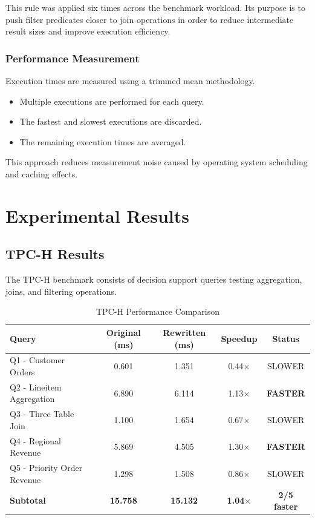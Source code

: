 \documentclass[12pt,a4paper]{article}
\begin{document}
This rule was applied six times across the benchmark workload. Its purpose is to push filter predicates closer to join operations in order to reduce intermediate result sizes and improve execution efficiency.

\subsubsection{Performance Measurement}

Execution times are measured using a trimmed mean methodology.

\begin{itemize}
    \item Multiple executions are performed for each query.
    \item The fastest and slowest executions are discarded.
    \item The remaining execution times are averaged.
\end{itemize}

This approach reduces measurement noise caused by operating system scheduling and caching effects.

\section{Experimental Results}

\subsection{TPC-H Results}

The TPC-H benchmark consists of decision support queries testing aggregation, joins, and filtering operations.

\begin{table}[H]
\centering
\caption{TPC-H Performance Comparison}
\begin{tabular}{|l|c|c|c|c|}
\hline
\textbf{Query} & \textbf{Original (ms)} & \textbf{Rewritten (ms)} & \textbf{Speedup} & \textbf{Status} \\
\hline
Q1 - Customer Orders & 0.601 & 1.351 & 0.44$\times$ & SLOWER \\
Q2 - Lineitem Aggregation & 6.890 & 6.114 & 1.13$\times$ & \textbf{FASTER} \\
Q3 - Three Table Join & 1.100 & 1.654 & 0.67$\times$ & SLOWER \\
Q4 - Regional Revenue & 5.869 & 4.505 & 1.30$\times$ & \textbf{FASTER} \\
Q5 - Priority Order Revenue & 1.298 & 1.508 & 0.86$\times$ & SLOWER \\
\hline
\textbf{Subtotal} & \textbf{15.758} & \textbf{15.132} & \textbf{1.04$\times$} & \textbf{2/5 faster} \\
\hline
\end{tabular}
\end{table}
\end{document}
